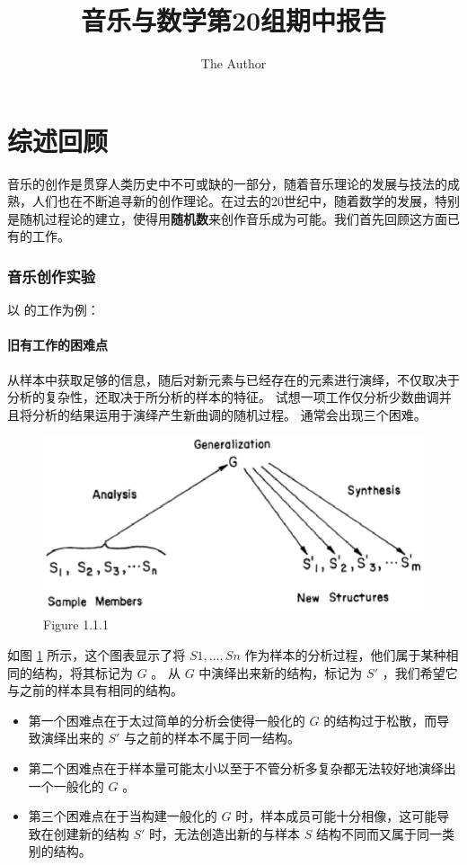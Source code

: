 \documentclass[11pt]{article}
\title{音乐与数学第20组期中报告}
\author{The Author}
\begin{document}
\maketitle

\part{综述回顾}
音乐的创作是贯穿人类历史中不可或缺的一部分，随着音乐理论的发展与技法的成熟，人们也在不断追寻新的创作理论。在过去的20世纪中，随着数学的发展，特别是随机过程论的建立，使得用\textbf{随机数}来创作音乐成为可能。我们首先回顾这方面已有的工作。
\section{音乐创作实验}
以 \cite{Brooks:1992:EMC:167765.167774} 的工作为例：
\subsection{旧有工作的困难点}
从样本中获取足够的信息，随后对新元素与已经存在的元素进行演绎，不仅取决于分析的复杂性，还取决于所分析的样本的特征。
试想一项工作仅分析少数曲调并且将分析的结果运用于演绎产生新曲调的随机过程。
通常会出现三个困难。
\begin{figure}[hptb]
	\centering
	\label{fig:1.1.1}
	\includegraphics[width=\textwidth]{pic/1.1.1.eps}
	\caption{Figure 1.1.1}
\end{figure}	
如图 \ref{fig:1.1.1} 所示，这个图表显示了将 $S1, \dots, Sn$ 作为样本的分析过程，他们属于某种相同的结构，将其标记为 $G$ 。
从 $G$ 中演绎出来新的结构，标记为 $S'$ ，我们希望它与之前的样本具有相同的结构。
\begin{itemize}
\item 第一个困难点在于太过简单的分析会使得一般化的 $G$ 的结构过于松散，而导致演绎出来的 $S'$ 与之前的样本不属于同一结构。
\item 第二个困难点在于样本量可能太小以至于不管分析多复杂都无法较好地演绎出一个一般化的 $G$ 。
\item 第三个困难点在于当构建一般化的 $G$ 时，样本成员可能十分相像，这可能导致在创建新的结构 $S'$ 时，无法创造出新的与样本 $S$ 结构不同而又属于同一类别的结构。
\end{itemize} 
\end{document}
